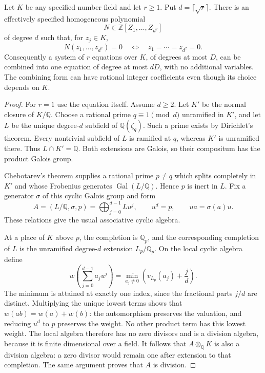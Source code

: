 \begin{theorem}\label{thm:division-norm-conjunction-phase3}
Let $K$ be any specified number field and let $r\ge1$.
Put $d=\lceil\sqrt r\rceil$.  There is an effectively specified
homogeneous polynomial
\[
                 N\in\mathbb Z[Z_1,\ldots,Z_{d^2}]
\]
of degree $d$ such that, for $z_j\in K$,
\[
                  N(z_1,\ldots,z_{d^2})=0
                  \quad\Longleftrightarrow\quad z_1=\cdots=z_{d^2}=0.
\]
Consequently a system of $r$ equations over $K$, of degrees at
most $D$, can be combined into one equation of degree at most
$dD$, with no additional variables.  The combining form can have
rational integer coefficients even though its choice depends on $K$.
\end{theorem}
\begin{proof}
For $r=1$ use the equation itself.  Assume $d\ge2$.  Let $K'$ be
the normal closure of $K/\mathbb Q$.  Choose a rational prime
$q\equiv1\pmod d$ unramified in $K'$, and let $L$ be the unique
degree-$d$ subfield of $\mathbb Q(\zeta_q)$.  Such a prime exists
by Dirichlet's theorem.  Every nontrivial subfield of $L$ is
ramified at $q$, whereas $K'$ is unramified there.  Thus
$L\cap K'=\mathbb Q$.  Both extensions are Galois, so their
compositum has the product Galois group.

Chebotarev's theorem supplies a rational prime $p\ne q$ which
splits completely in $K'$ and whose Frobenius generates
$\operatorname{Gal}(L/\mathbb Q)$.  Hence $p$ is inert in $L$.
Fix a generator $\sigma$ of this cyclic Galois group and form
\[
 A=(L/\mathbb Q,\sigma,p)
   =\bigoplus_{j=0}^{d-1}L u^j,
 \qquad u^d=p,\qquad ua=\sigma(a)u.
\]
These relations give the usual associative cyclic algebra.

At a place of $K$ above $p$, the completion is $\mathbb Q_p$,
and the corresponding completion of $L$ is the unramified
degree-$d$ extension $L_p/\mathbb Q_p$.  On the local cyclic
algebra define
\[
 w\left(\sum_{j=0}^{d-1}a_j u^j\right)
       =\min_{a_j\ne0}\left(v_{L_p}(a_j)+\frac jd\right).
\]
The minimum is attained at exactly one index, since the
fractional parts $j/d$ are distinct.  Multiplying the unique
lowest terms shows that $w(ab)=w(a)+w(b)$: the automorphism
preserves the valuation, and reducing $u^d$ to $p$ preserves
the weight.  No other product term has this lowest weight.
The local algebra therefore has no zero divisors and is a
division algebra, because it is finite dimensional over a field.
It follows that $A\otimes_{\mathbb Q}K$ is also a division
algebra: a zero divisor would remain one after extension to
that completion.  The same argument proves that $A$ is division.


\end{proof}
